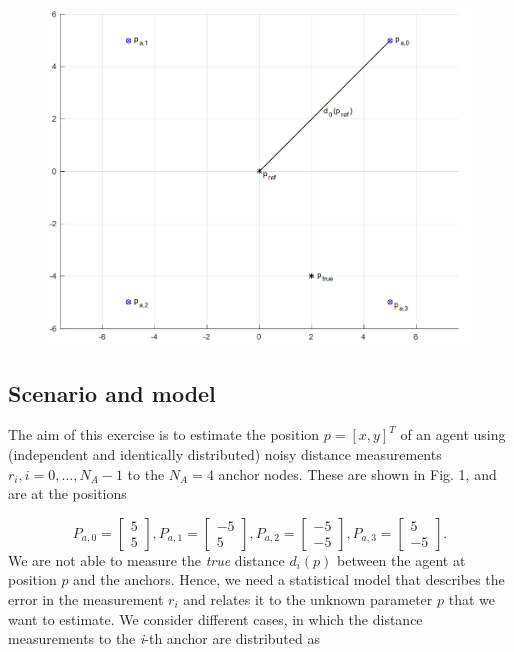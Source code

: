 \documentclass[a4paper]{article}
\begin{document}
\begin{figure}[htp]
\centering
  \includegraphics[scale=0.38]{plots/four_anchors.png}
  \label{fig:15}
\end{figure}

\subsection{ Scenario and model}
The aim of this exercise is to estimate the position $p = [x, y]^T$ of an agent using (independent and identically distributed) noisy distance measurements $r_i, i = 0, . . . , N_A − 1$ to the $N_A = 4$ anchor nodes. These are shown in Fig. 1, and are at the positions

\[
P_{a,0}=
  \begin{bmatrix}
    5  \\
    5
  \end{bmatrix},
P_{a,1}=
  \begin{bmatrix}
    -5  \\
    5
  \end{bmatrix},
P_{a,2}=
  \begin{bmatrix}
    -5  \\
    -5
  \end{bmatrix},
P_{a,3}=
  \begin{bmatrix}
    5  \\
    -5
  \end{bmatrix}.
\]
We are not able to measure the \textit{true} distance $d_i(p)$ between the agent at position $p$ and the anchors. Hence, we need a statistical model that describes the error in the measurement $r_i$ and relates it to the unknown parameter $p$ that we want to estimate. We consider different cases, in which the distance measurements to the \textit{i}-th anchor are distributed as
\end{document}
